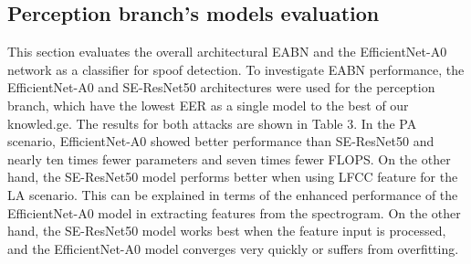 \documentclass[a4paper]{article}
\begin{document}
\subsection{Perception branch’s models evaluation}
This section evaluates the overall architectural EABN and the EfficientNet-A0 network as a classifier for spoof detection. To investigate EABN performance, the EfficientNet-A0 and SE-ResNet50 architectures were used for the perception branch, which have the lowest EER as a single model to the best of our knowled.ge. The results for both attacks are shown in Table 3. In the PA scenario, EfficientNet-A0 showed better performance than SE-ResNet50 and nearly ten times fewer parameters and seven times fewer FLOPS. On the other hand, the SE-ResNet50 model performs better when using LFCC feature for the LA scenario. This can be explained in terms of the enhanced performance of the EfficientNet-A0 model in extracting features from the spectrogram. On the other hand, the SE-ResNet50 model works best when the feature input is processed, and the EfficientNet-A0 model converges very quickly or suffers from overfitting.
\end{document}
